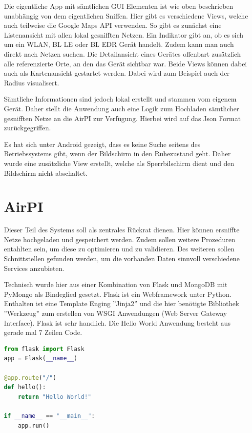 \documentclass[11pt,a4paper]{article}
\begin{document}
Die eigentliche App mit sämtlichen GUI Elementen ist wie oben beschrieben unabhängig von dem eigentlichen Sniffen. Hier gibt es verschiedene Views, welche auch teilweise die Google Maps API verwenden.
So gibt es zunächst eine Listenansicht mit allen lokal gesnifften Netzen. Ein Indikator gibt an, ob es sich um ein WLAN, BL LE oder BL EDR Gerät handelt. Zudem kann man auch direkt nach Netzen suchen. Die Detailansicht eines Gerätes offenbart zusätzlich alle referenzierte Orte, an den das Gerät sichtbar war. 
Beide Views können dabei auch als Kartenansicht gestartet werden. Dabei wird zum Beispiel auch der Radius visualisert. 

Sämtliche Informationen sind jedoch lokal erstellt und stammen vom eigenem Gerät. Daher stellt die Anwendung auch eine Logik zum Hochladen sämtlicher gesnifften Netze an die AirPI zur Verfügung. Hierbei wird auf das Json Format zurückgegriffen. 

Es hat sich unter Android gezeigt, dass es keine Suche seitens des Betriebssystems gibt, wenn der Bildschirm in den Ruhezustand geht. Daher wurde eine zusätzliche View erstellt, welche als Sperrbilschirm dient und den Bildschirm nicht abschaltet.


\section{AirPI}

Dieser Teil des Systems soll als zentrales Rückrat dienen. Hier können ersniffte Netze hochgeladen und gespeichert werden. Zudem sollen weitere Prozeduren entahlten sein, um diese zu optimieren und zu validieren. 
Des weiteren sollen Schnittstellen gefunden werden, um die vorhanden Daten sinnvoll  verschiedene Services anzubieten.

Technisch wurde hier aus einer Kombination von Flask und MongoDB mit PyMongo als Bindeglied gesetzt. Flask ist ein Webframework unter Python. Enthalten ist eine Template Enging ''Jinja2'' und die hier benötigte Bibliothek ''Werkzeug'' zum erstellen von WSGI Anwendungen (Web Server Gateway Interface). Flask ist sehr handlich. Die Hello World Anwendung besteht aus gerade mal 7 Zeilen Code.

\begin{lstlisting}[language=Python]
from flask import Flask
app = Flask(__name__)

@app.route("/")
def hello():
    return "Hello World!"
    
if __name__ == "__main__":
    app.run()
\end{lstlisting}
\end{document}
